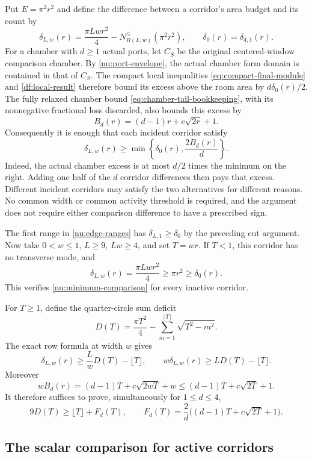 \documentclass[11pt,reqno]{amsart}
\numberwithin{equation}{section}
\begin{document}
Put $E=\pi^2r^2$ and define the difference between a corridor's area
budget and its count by
\[
 \delta_{L,w}(r)=\frac{\pi Lw r^2}{4}
                     -N_{R(L,w)}^{\le}(\pi^2r^2),
 \qquad \delta_0(r)=\delta_{4,1}(r).
\]
For a chamber with $d\ge1$ actual ports, let $C_S$ be the original
centered-window comparison chamber. By \eqref{nu:port-envelope}, the
actual chamber form domain is contained in that of $C_S$. The compact
local inequalities \eqref{eq:compact-final-module} and
\eqref{df:local-result} therefore bound its excess above the room area
by $d\delta_0(r)/2$. The fully relaxed chamber bound
\eqref{eq:chamber-tail-bookkeeping}, with its nonnegative fractional
loss discarded, also bounds this excess by
\[
 B_d(r)=(d-1)r+c\sqrt{2r}+1.
\]
Consequently it is enough that each incident corridor satisfy
\begin{equation}
 \delta_{L,w}(r)\ge
 \min\left\{\delta_0(r),\frac{2B_d(r)}d\right\}.
 \label{nu:minimum-comparison}
\end{equation}
Indeed, the actual chamber excess is at most $d/2$ times the minimum
on the right. Adding one half of the $d$ corridor differences then
pays that excess. Different incident corridors may satisfy the two
alternatives for different reasons. No common width or common activity
threshold is required, and the argument does not require either
comparison difference to have a prescribed sign.

The first range in \eqref{nu:edge-ranges} has
$\delta_{L,1}\ge\delta_0$ by the preceding cut argument. Now take
$0<w\le1$, $L\ge9$, $Lw\ge4$, and set $T=wr$. If $T<1$, this
corridor has no transverse mode, and
\[
 \delta_{L,w}(r)=\frac{\pi Lw r^2}{4}
 \ge\pi r^2\ge\delta_0(r).
\]
This verifies \eqref{nu:minimum-comparison} for every inactive corridor.

For $T\ge1$, define the quarter-circle sum deficit
\[
 D(T)=\frac{\pi T^2}{4}
      -\sum_{m=1}^{\lfloor T\rfloor}\sqrt{T^2-m^2}.
\]
The exact row formula at width $w$ gives
\[
 \delta_{L,w}(r)\ge\frac LwD(T)-\lfloor T\rfloor,
 \qquad
 w\delta_{L,w}(r)\ge L D(T)-\lfloor T\rfloor.
\]
Moreover
\[
 wB_d(r)=(d-1)T+c\sqrt{2wT}+w
 \le(d-1)T+c\sqrt{2T}+1.
\]
It therefore suffices to prove, simultaneously for $1\le d\le4$,
\begin{equation}
 9D(T)\ge\lfloor T\rfloor+
 F_d(T),\qquad
 F_d(T)=\frac{2}{d}\bigl((d-1)T+c\sqrt{2T}+1\bigr).
 \label{nu:active-scalar}
\end{equation}

\subsection{The scalar comparison for active corridors}
\end{document}
